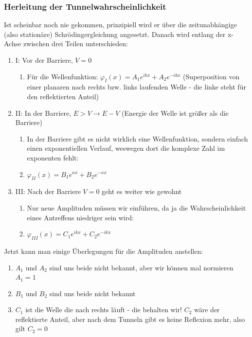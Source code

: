 \documentclass{article}
\begin{document}
\subsubsection{Herleitung der Tunnelwahrscheinlichkeit}
Ist scheinbar noch nie gekommen, prinzipiell wird er über die zeitunabhängige (also stationäre) Schrödingergleichung angesetzt. 
Danach wird entlang der x-Achse zwischen drei Teilen unterschieden:
\begin{enumerate}
    \item I: Vor der Barriere, $V = 0$
    \begin{enumerate}
        \item Für die Wellenfunktion: $\varphi_I(x) = A_1e^{ikx} + A_2e^{-ikx}$ (Superposition von einer planaren nach rechts bzw. links laufenden Welle - die linke steht für den reflektierten Anteil)
    \end{enumerate}
    \item II: In der Barriere, $E > V \rightarrow E - V$ (Energie der Welle ist größer als die Barriere)
    \begin{enumerate}
        \item In der Barriere gibt es nicht wirklich eine Wellenfunktion, sondern einfach einen exponentiellen Verlauf, weswegen dort die komplexe Zahl im exponenten fehlt:
        \item $\varphi_{II}(x) = B_1e^{\kappa x} + B_2e^{-\kappa x}$
    \end{enumerate}
    \item III: Nach der Barriere $V = 0$ geht es weiter wie gewohnt
    \begin{enumerate}
        \item Nur neue Amplituden müssen wir einführen, da ja die Wahrscheinlichkeit eines Antreffens niedriger sein wird:
        \item $\varphi_{III}(x) = C_1e^{ikx} + C_2e^{-ikx}$
    \end{enumerate}
\end{enumerate}

Jetzt kann man einige Überlegungen für die Amplituden anstellen:
\begin{enumerate}
    \item $A_1$ und $A_2$ sind uns beide nicht bekannt, aber wir können mal normieren $A_1 = 1$
    \item $B_1$ und $B_2$ sind uns beide nicht bekannt
    \item $C_1$ ist die Welle die nach rechts läuft - die behalten wir! $C_2$ wäre der reflektierte Anteil, aber nach dem Tunneln gibt es keine Reflexion mehr, also gilt $C_2 = 0$
\end{enumerate}
\end{document}
